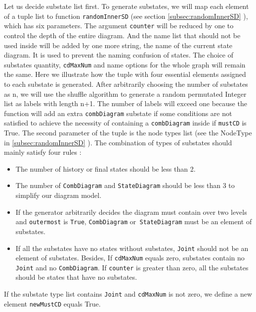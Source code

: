 Let us decide substate list first. 
To generate substates, we will map each element of a tuple list to function \verb|randomInnerSD| (see section \ref{subsec:randomInnerSD} ), which has six parameters. 
The argument \verb|counter| will be reduced by one to control the depth of the entire diagram.
And the name list that should not be used inside will be added by one more string, the name of the current state diagram. It is used to prevent the naming confusion of states.
The choice of substates quantity, \verb|cdMaxNum| and name options for the whole graph will remain the same.
Here we illustrate how the tuple with four essential elements assigned to each substate is generated.
After arbitrarily choosing the number of substates as n, we will use the shuffle algorithm to generate a random permutated Integer list as labels with length n+1. 
The number of labels will exceed one because the function will add an extra \verb|combDiagram| substate if some conditions are not satisfied to achieve the necessity of containing a \verb|combDiagram| inside if \verb|mustCD| is True.
The second parameter of the tuple is the node types list (see the NodeType in \ref{subsec:randomInnerSD} ).
The combination of types of substates should mainly satisfy four rules :
\begin{itemize}
\item The number of history or final states should be less than 2.
\end{itemize}
\begin{itemize}
\item The number of \verb|CombDiagram| and \verb|StateDiagram| should be less than 3 to simplify our diagram model.
\end{itemize}
\begin{itemize}
\item If the generator arbitrarily decides the diagram must contain over two levels and \verb|outermost| is \verb|True|, \verb|CombDiagram| or\verb| StateDiagram| must be an element of substates.
\end{itemize}
\begin{itemize}
\item If all the substates have no states without substates, \verb|Joint| should not be an element of substates.
Besides, If \verb|cdMaxNum| equals zero, substates contain no \verb|Joint| and no \verb|CombDiagram|.
If \verb|counter| is greater than zero, all the substates should be states that have no substates.
\end{itemize}
If the substate type list contains \verb|Joint| and \verb|cdMaxNum| is not zero, we define a new element \verb|newMustCD| equals True.
